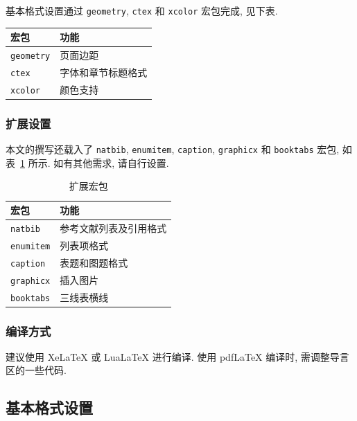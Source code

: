 \documentclass{article}
\begin{document}
基本格式设置通过 \verb'geometry', \verb'ctex' 和 \verb'xcolor' 宏包完成, 见下表.
\smallskip
\begin{center}
  \begin{tabular}{ll} \toprule
    \sffamily 宏包  & \sffamily 功能 \\ \midrule
    \verb'geometry' & 页面边距 \\
    \verb'ctex'     & 字体和章节标题格式 \\
    \verb'xcolor'   & 颜色支持 \\ \bottomrule
  \end{tabular} 
\end{center}
\smallskip

\subsubsection{扩展设置}

本文的撰写还载入了 \verb'natbib', \verb'enumitem', \verb'caption', \verb'graphicx' 和 \verb'booktabs' 宏包, 如表~\ref{tab:extra} 所示.
如有其他需求, 请自行设置.

\begin{table}[htbp!]
  \caption{扩展宏包}
  \label{tab:extra}
  \centering
  \begin{tabular}{ll}
    \toprule
    \sffamily 宏包  & \sffamily 功能 \\
    \midrule
    \verb'natbib'   & 参考文献列表及引用格式 \\ 
    \verb'enumitem' & 列表项格式 \\
    \verb'caption'  & 表题和图题格式 \\
    \verb'graphicx' & 插入图片 \\
    \verb'booktabs' & 三线表横线 \\
    \bottomrule
  \end{tabular} 
\end{table}

\subsubsection{编译方式}

建议使用 XeLaTeX 或 LuaLaTeX 进行编译.
使用 pdfLaTeX 编译时, 需调整导言区的一些代码.

\subsection{基本格式设置}
\end{document}
